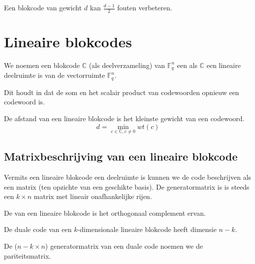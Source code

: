 \documentclass[main.tex]{subfiles}
\begin{document}
\begin{gev}
  Een blokcode van gewicht $d$ kan $\frac{d-1}{2}$ fouten verbeteren.
\end{gev}

\section{Lineaire blokcodes}

\begin{de}
  We noemen een blokcode $\mathbb{C}$ (als deelverzameling) van $\mathbb{F}_{q}^{n}$ een  als $\mathbb{C}$ een lineaire deelruimte is van de vectorruimte $\mathbb{F}_{q}^{n}$.
\end{de}

\begin{opm}
  Dit houdt in dat de som en het scalair product van codewoorden opnieuw een codewoord is.
\end{opm}

\begin{st}
  De afstand van een lineaire blokcode is het kleinste gewicht van een codewoord.
  \[ d = \min_{c\in \mathbb{C}, c\neq 0} wt(c) \]
\end{st}

\subsection{Matrixbeschrijving van een lineaire blokcode}

\begin{de}
  Vermits een lineaire blokcode een deelruimte is kunnen we de code beschrijven als een matrix (ten opzichte van een geschikte basis).
  De generatormatrix is is steeds een $k\times n$ matrix met lineair onafhankelijke rijen.
\end{de}

\begin{de}
  De  van een lineaire blokcode is het orthogonaal complement ervan.
\end{de}

\begin{ei}
  De duale code van een $k$-dimensionale lineaire blokcode heeft dimensie $n-k$.
\end{ei}

\begin{de}
  De  ($n-k\times n$) generatormatrix van een duale code noemen we de pariteitsmatrix.
\end{de}
\end{document}
